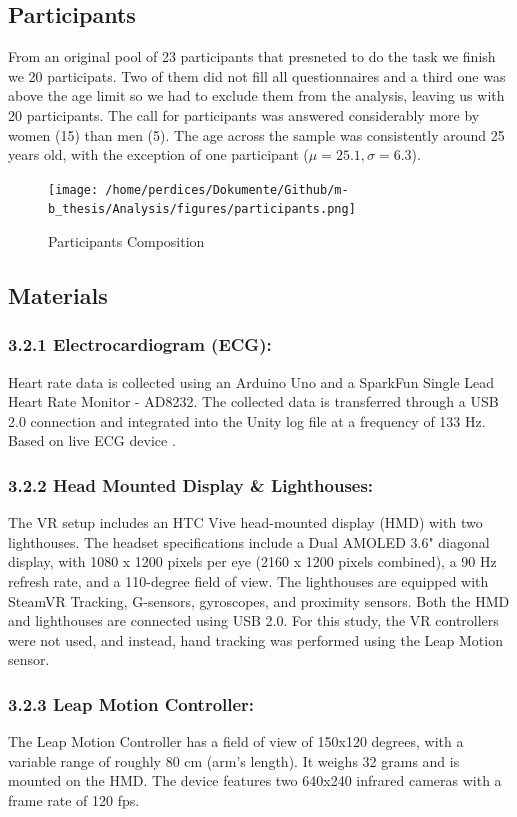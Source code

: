 \documentclass[12pt,oneside,openright]{report}
\begin{document}
    \subsection*{Participants}
    From an original pool of 23 participants that presneted to do the task we finish we 20 participats. Two of them did not fill all questionnaires and a third one was above the age limit  so we had to exclude them from the analysis, leaving us with 20 participants. The call for participants was answered considerably more by women (15) than men (5). The age across the sample was consistently around 25 years old, with the exception of one participant ($\mu=25.1 , \sigma=6.3$).
    \begin{figure}[h]
        \centering
        \texttt{[image: /home/perdices/Dokumente/Github/m-b\_thesis/Analysis/figures/participants.png]}
        \caption{Participants Composition}
        \label{fig:mesh1}
    \end{figure}
    
    \subsection*{Materials}
    \subsubsection*{3.2.1 Electrocardiogram (ECG):}
Heart rate data is collected using an Arduino Uno and a SparkFun Single Lead Heart Rate Monitor - AD8232. The collected data is transferred through a USB 2.0 connection and integrated into the Unity log file at a frequency of 133 Hz. Based on live ECG device \parencite{TimsECG}.

\subsubsection*{3.2.2 Head Mounted Display \& Lighthouses:}
The VR setup includes an HTC Vive head-mounted display (HMD) with two lighthouses. The headset specifications include a Dual AMOLED 3.6" diagonal display, with 1080 x 1200 pixels per eye (2160 x 1200 pixels combined), a 90 Hz refresh rate, and a 110-degree field of view. The lighthouses are equipped with SteamVR Tracking, G-sensors, gyroscopes, and proximity sensors. Both the HMD and lighthouses are connected using USB 2.0. For this study, the VR controllers were not used, and instead, hand tracking was performed using the Leap Motion sensor.

\subsubsection*{3.2.3 Leap Motion Controller:}
The Leap Motion Controller has a field of view of 150x120 degrees, with a variable range of roughly 80 cm (arm's length). It weighs 32 grams and is mounted on the HMD. The device features two 640x240 infrared cameras with a frame rate of 120 fps.
\end{document}

